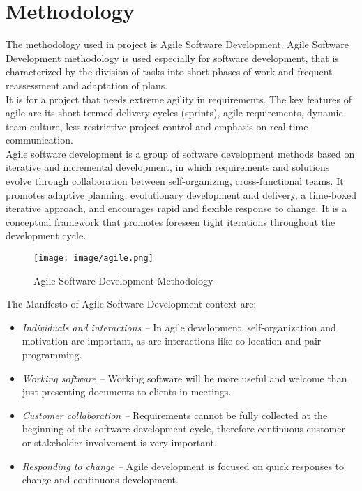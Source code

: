 \pagebreak
\section{Methodology}
The methodology used in project is Agile Software Development. Agile Software Development methodology is used especially for software development, that is characterized by the division of tasks into short phases of work and frequent reassessment and adaptation of plans.\\

It is for a project that needs extreme agility in requirements. The key features of agile are its short-termed delivery cycles (sprints), agile requirements, dynamic team culture, less restrictive project control and emphasis on real-time communication.\\

Agile software development is a group of software development methods based on iterative and incremental development, in which requirements and solutions evolve through collaboration between self-organizing, cross-functional teams. It promotes adaptive planning, evolutionary development and delivery, a time-boxed iterative approach, and encourages rapid and flexible response to change. It is a conceptual framework that promotes foreseen tight iterations throughout the development cycle.\\
\begin{figure}[H]
\centering \texttt{[image: image/agile.png]}
\caption{Agile Software Development Methodology}
\end{figure}


The Manifesto of Agile Software Development context are:
\begin{itemize}
\item \emph{Individuals and interactions –} In agile development, self-organization and motivation are important, as are interactions like co-location and pair programming.
\item \emph{Working software –} Working software will be more useful and welcome than just presenting documents to clients in meetings.
\item \emph{Customer collaboration –} Requirements cannot be fully collected at the beginning of the software development cycle, therefore continuous customer or stakeholder involvement is very important.
\item \emph{Responding to change –} Agile development is focused on quick responses to change and continuous development.
\end{itemize}
